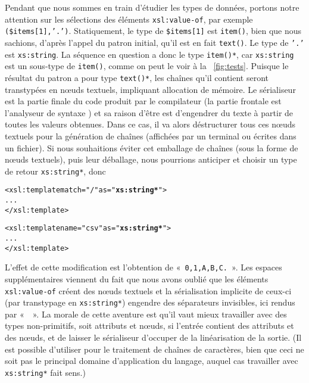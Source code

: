 Pendant que nous sommes en train d'étudier les types de données,
portons notre attention sur les sélections des éléments
\texttt{xsl:value-of}, par exemple
\texttt{(\$items[1],'.')}. Statiquement, le type de
\texttt{\$items[1]} est \texttt{item()}, bien que nous sachions,
d'après l'appel du patron initial, qu'il est en fait \texttt{text()}.
Le type de \texttt{'.'} est \texttt{xs:string}. La séquence en
question a donc le type \texttt{item()*}, car \texttt{xs:string} est
un sous-type de \texttt{item()}, comme on peut le voir à la
\fig~\vref{fig:tests}. Puisque le résultat du patron a pour type
\texttt{text()*}, les chaînes qu'il contient seront transtypées en
n{\oe}uds textuels, impliquant allocation de mémoire. Le sérialiseur
est la partie finale du code produit par le compilateur \XSLT (la
partie frontale est l'analyseur de syntaxe \XML) et sa raison d'être
est d'engendrer du texte à partir de toutes les valeurs obtenues. Dans
ce cas, il va alors déstructurer tous ces n{\oe}uds textuels pour la
génération de chaînes (affichées par un terminal ou écrites dans un
fichier). Si nous souhaitions éviter cet emballage de chaînes (sous
la forme de n{\oe}uds textuels), puis leur déballage, nous pourrions
anticiper et choisir un type de retour \texttt{xs:string*}, donc
\begin{alltt}
\small  <xsl:template match="/" as="\textbf{xs:string*}">
    ...
  </xsl:template>

  <xsl:template name="csv" as="\textbf{xs:string*}">
    ...
  </xsl:template>
\end{alltt}
L'effet de cette modification est l'obtention de
«~\texttt{0,\textvisiblespace{}1,\textvisiblespace{}A,\textvisiblespace{}B,\textvisiblespace{}C.}~». Les
espaces supplémentaires viennent du fait que nous avons oublié que les
éléments \texttt{xsl:value-of} créent des n{\oe}uds textuels et la
sérialisation implicite de ceux-ci (par transtypage en
\texttt{xs:string*}) engendre des séparateurs invisibles, ici rendus
par «~\texttt{\textvisiblespace}~». La morale de cette aventure est
qu'il vaut mieux travailler avec des types non-primitifs, soit
attributs et n{\oe}uds, si l'entrée contient des attributs et des
n{\oe}uds, et de laisser le sérialiseur d'occuper de la linéarisation
de la sortie. (Il est possible d'utiliser \XSLT pour le traitement de
chaînes de caractères, bien que ceci ne soit pas le principal domaine
d'application du langage, auquel cas travailler avec
\texttt{xs:string*} fait sens.)

